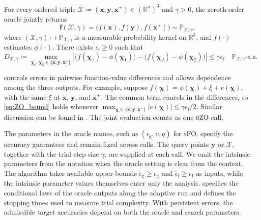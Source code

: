 \documentclass{article}
\begin{document}
\begin{assumption}
\label{BZO}
For every ordered triple
\(\mathcal X\coloneqq (\bm{x},\bm{y},\bm{x}^+)\in(\mathbb R^n)^3\) and \(\gamma>0\), the
zeroth-order oracle jointly returns
\[
\mathbf{f}(\mathcal X,\gamma)
=
\bigl(f(\bm{x}),f(\bm{y}),f(\bm{x}^+)\bigr)
\sim\mathbb P_{\mathcal X,\gamma},
\]
where
\((\mathcal X,\gamma)\mapsto\mathbb P_{\mathcal X,\gamma}\) is a
measurable probability kernel on \(\mathbb R^3\), and \(f(\cdot)\)
estimates \(\phi(\cdot)\). There exists \(\epsilon_{\mathrm{f}}\ge0\) such that
\begin{equation}\label{eq:ZO_bound}
D_{\mathcal X,\gamma}
\coloneqq 
\max_{\bm{\chi}_1,\bm{\chi}_2\in\{\bm{x},\bm{y},\bm{x}^+\}}
\left|
\bigl(f(\bm{\chi}_1)-\phi(\bm{\chi}_1)\bigr)
-
\bigl(f(\bm{\chi}_2)-\phi(\bm{\chi}_2)\bigr)
\right|
\le
\gamma\epsilon_{\mathrm{f}}
\quad
\mathbb P_{\mathcal X,\gamma}\text{-a.s.}
\end{equation}
\end{assumption}

\begin{remark}
\label{rem:BZO_interpretation}
 controls errors in pairwise function-value differences
and allows dependence among the three outputs. 
For example, suppose \(f(\bm\chi)=\phi(\bm\chi)+\xi+e(\bm\chi)\),
with the same \(\xi\) at \(\bm x\), \(\bm y\), and \(\bm x^+\).
The common term cancels in the differences, so
\eqref{eq:ZO_bound} holds whenever
\(\max_{\bm\chi\in\{\bm x,\bm y,\bm x^+\}}|e(\bm\chi)|
\leq\gamma\epsilon_{\mathrm f}/2\). Similar discussion can be found in \cite{Xie2024,scheinberg2025stochasticadaptiveoptimizationunreliable}.
The joint evaluation counts as one \textsc{bZO} call. 
\end{remark}

The parameters in the oracle names, such as
$(\epsilon_{\mathrm g},\upsilon,q)$ for \textsc{sFO}, specify
the accuracy guarantees and remain fixed across calls.
The query points $\bm y$ or $\mathcal X$, together with the
trial step size $\gamma$, are supplied at each call.
We omit the intrinsic parameters from the notation when
the oracle setting is clear from the context.
The algorithm takes available upper bounds
$\widetilde\epsilon_{\mathrm g}\ge\epsilon_{\mathrm g}$ and
$\widetilde\epsilon_{\mathrm f}\ge\epsilon_{\mathrm f}$ as inputs,
while the intrinsic parameter values themselves enter only
the analysis.
 specifies the conditional laws of the
oracle outputs along the adaptive run and defines the stopping
times used to measure trial complexity.
With persistent errors, the admissible target accuracies depend
on both the oracle and search parameters.
\end{document}
